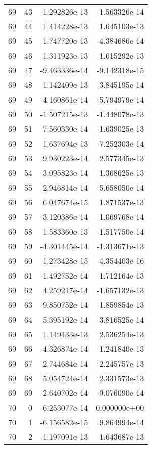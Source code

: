 \begin{tabular}{rrrr}
  69 &   43 & -1.292826e-13 &  1.563326e-14 \\
  69 &   44 &  1.414228e-13 &  1.645103e-13 \\
  69 &   45 &  1.747720e-13 & -4.384686e-14 \\
  69 &   46 & -1.311923e-13 &  1.615292e-13 \\
  69 &   47 & -9.463336e-14 & -9.142318e-15 \\
  69 &   48 &  1.142409e-13 & -3.845195e-14 \\
  69 &   49 & -4.160861e-14 & -5.794979e-14 \\
  69 &   50 & -1.507215e-13 & -1.448078e-13 \\
  69 &   51 &  7.560330e-14 & -1.639025e-13 \\
  69 &   52 &  1.637694e-13 & -7.252303e-14 \\
  69 &   53 &  9.930223e-14 &  2.577345e-13 \\
  69 &   54 &  3.095823e-14 &  1.368625e-13 \\
  69 &   55 & -2.946814e-14 &  5.658050e-14 \\
  69 &   56 &  6.047674e-15 &  1.871537e-13 \\
  69 &   57 & -3.120386e-14 & -1.069768e-14 \\
  69 &   58 &  1.583360e-13 & -1.517750e-14 \\
  69 &   59 & -4.301445e-14 & -1.313671e-13 \\
  69 &   60 & -1.273428e-15 & -4.354403e-16 \\
  69 &   61 & -1.492752e-14 &  1.712164e-13 \\
  69 &   62 &  4.259217e-14 & -1.657132e-13 \\
  69 &   63 &  9.850752e-14 & -1.859854e-13 \\
  69 &   64 &  5.395192e-14 &  3.816525e-14 \\
  69 &   65 &  1.149433e-13 &  2.536254e-13 \\
  69 &   66 & -4.326874e-14 &  1.241840e-13 \\
  69 &   67 &  2.744684e-14 & -2.245757e-13 \\
  69 &   68 &  5.054724e-14 &  2.331573e-13 \\
  69 &   69 & -2.640702e-14 & -9.076090e-14 \\
  70 &    0 &  6.253077e-14 &  0.000000e+00 \\
  70 &    1 & -6.156582e-15 &  9.864994e-14 \\
  70 &    2 & -1.197091e-13 &  1.643687e-13 \\

\end{tabular}
